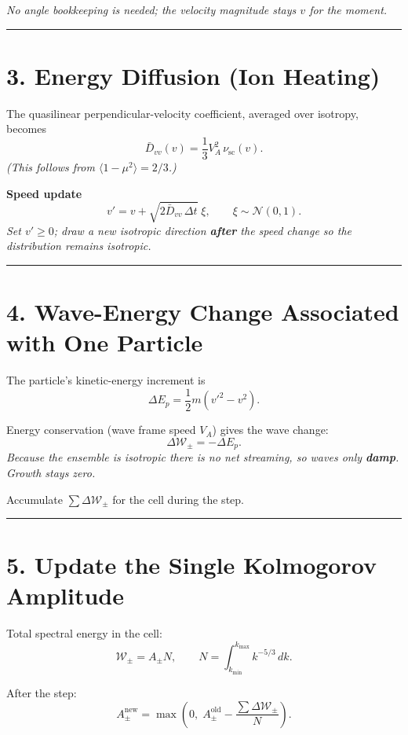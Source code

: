 \emph{No angle bookkeeping is needed; the velocity magnitude stays \( v \) for the moment.}

\bigskip
\hrule
\bigskip

\section*{3. Energy Diffusion (Ion Heating)}

The quasilinear perpendicular-velocity coefficient, averaged over isotropy, becomes
\[
\boxed{ \bar{D}_{vv}(v) = \frac{1}{3} V_A^2 \, \nu_{\text{sc}}(v). }
\tag{3}
\]
\emph{(This follows from \( \langle 1 - \mu^2 \rangle = 2/3 \).)}

\bigskip

\textbf{Speed update}
\[
\boxed{ v' = v + \sqrt{2 \bar{D}_{vv} \, \Delta t} \; \xi, \qquad \xi \sim \mathcal{N}(0, 1). }
\tag{4}
\]
\emph{Set \( v' \geq 0 \); draw a new isotropic direction \textbf{after} the speed change so the distribution remains isotropic.}

\bigskip
\hrule
\bigskip

\section*{4. Wave-Energy Change Associated with One Particle}

The particle’s kinetic-energy increment is
\[
\boxed{ \Delta E_p = \frac{1}{2} m (v'^{2} - v^2). }
\tag{5}
\]

Energy conservation (wave frame speed \( V_A \)) gives the wave change:
\[
\boxed{ \Delta \mathcal{W}_\pm = - \Delta E_p. }
\tag{6}
\]
\emph{Because the ensemble is isotropic there is no net streaming, so waves only \textbf{damp}. Growth stays zero.}

Accumulate \( \sum \Delta \mathcal{W}_\pm \) for the cell during the step.

\bigskip
\hrule
\bigskip

\section*{5. Update the Single Kolmogorov Amplitude}

Total spectral energy in the cell:
\[
\mathcal{W}_\pm = A_\pm N, \qquad N = \int_{k_{\min}}^{k_{\max}} k^{-5/3} \, dk.
\]

After the step:
\[
\boxed{ A_\pm^{\text{new}} = \max\left( 0, \; A_\pm^{\text{old}} - \frac{\sum \Delta \mathcal{W}_\pm}{N} \right). }
\tag{7}
\]

